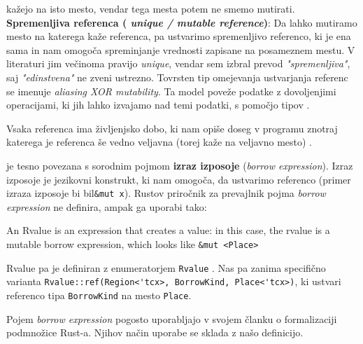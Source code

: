 \documentclass{article}
\begin{document}
\begin{description}
	      kažejo na isto mesto, vendar tega mesta potem ne smemo mutirati.
	      \subitem \textbf{Spremenljiva referenca (\textit{ unique / mutable reference})}: Da lahko mutiramo mesto na katerega kaže
	      referenca, pa ustvarimo spremenljivo referenco, ki je ena sama in nam omogoča spreminjanje vrednosti zapisane na posameznem mestu.
	      V literaturi jim večinoma pravijo \textit{unique}, vendar sem izbral prevod \textit{"spremenljiva"}, saj \textit{"edinstvena"} ne zveni ustrezno.
	      \subitem Tovrsten tip omejevanja ustvarjanja referenc se imenuje \textit{aliasing XOR mutability}. Ta model poveže podatke
	      z dovoljenjimi operacijami, ki jih lahko izvajamo nad temi podatki, s pomočjo tipov \cite{yanovskiGhostCellSeparatingPermissions2021}.
	\item[Življenska doba (\textit{lifetime})] Vsaka referenca ima življenjsko dobo, ki nam opiše doseg v programu znotraj katerega je
	      referenca še vedno veljavna (torej kaže na veljavno mesto) \cite{klabnikRustProgrammingLanguage2023}.
	\item[Posoja (\textit{loan})] je tesno povezana s sorodnim pojmom \textbf{izraz izposoje} (\textit{borrow expression}). Izraz izposoje
	      je jezikovni konstrukt, ki nam omogoča, da ustvarimo referenco (primer izraza izposoje bi bil\verb|&mut x|).
	      Rustov priročnik za prevajlnik \cite{MIRMidlevelIR} pojma \textit{borrow expression} ne definira, ampak ga uporabi tako:
	      \begin{displayquote}
		      An Rvalue is an expression that creates a value: in this case, the rvalue is a
		      mutable borrow expression, which looks like \verb|&mut <Place>|
	      \end{displayquote}

	      Rvalue pa je definiran z enumeratorjem \verb|Rvalue| \cite{RvalueRustc_middleMir}. Nas pa zanima specifično
	      varianta \verb|Rvalue::ref(Region<'tcx>, BorrowKind, Place<'tcx>)|, ki ustvari referenco tipa \verb|BorrowKind|
	      na mesto \verb|Place|.

	      Pojem \textit{borrow expression} pogosto uporabljajo \citeauthor{weissOxideEssenceRust2019} v svojem članku o formalizaciji
	      podmnožice Rust-a. Njihov način uporabe se sklada z našo definicijo.


\end{description}
\end{document}

